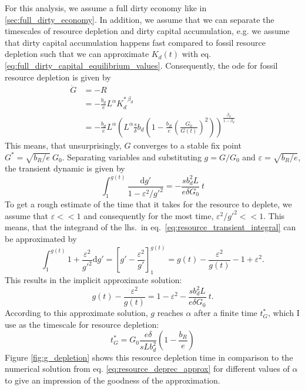For this analysis, we assume a full dirty economy like in \ref{sec:full_dirty_economy}. In addition, we assume that we can separate the timescales of resource depletion and dirty capital accumulation, e.g. we assume that dirty capital accumulation happens fast compared to fossil resource depletion such that we can approximate $K_d(t)$ with eq. \ref{eq:full_dirty_capital_equilibrium_values}. Consequently, the ode for fossil resource depletion is given by
\begin{align}
	\dot{G} &= -R \nonumber \\
        &= -\frac{b_d}{e}L^{\alpha}K_d^{*\ \beta_d} \nonumber \\
	&= - \frac{b_d}{e}L^{\alpha}\left(L^{\alpha} \frac{s}{\delta}b_d\left( 1-\frac{b_R}{e}\left( \frac{G_0}{G(t)} \right)^2 \right) \right)^{\frac{\beta_d}{1-\beta_d}}
	\label{eq:resource_deprec_approx}
\end{align}
This means, that unsurprisingly, $G$ converges to a stable fix point $G^* = \sqrt{b_R/e}\ G_0$. Separating variables and substituting $g = G/G_0$ and $\varepsilon = \sqrt{b_R/e}$, the transient dynamic is given by
\begin{equation}
	\int_1^{g(t)} \frac{{\mathrm d} g'}{1 - \varepsilon^2/g'^2} = - \frac{s b_d^2 L}{e \delta G_0} \ t
	\label{eq:resource_transient_integral}
\end{equation}
To get a rough estimate of the time that it takes for the resource to deplete, we assume that $\varepsilon << 1$ and consequently for the most time, $\varepsilon^2/g'^2 << 1$.
This means, that the integrand of the lhs.\ in eq.~\eqref{eq:resource_transient_integral} can be approximated by
\begin{equation}
	\int_1^{g(t)}1+\frac{\varepsilon^2}{g'^2} {\mathrm d}g' = \left[ g' - \frac{\varepsilon^2}{g'} \right]_1^{g(t)} = g(t) - \frac{\varepsilon^2}{g(t)} -1+\varepsilon^2.
	\label{eq:resource_transient_solution}
\end{equation}
This results in the implicit approximate solution:
\begin{equation}
  g(t) - \frac{\varepsilon^2}{g(t)} = 1 -\varepsilon^2 - \frac{s b_d^2 L}{e \delta G_0} \ t.
	\label{eq:resource_transient_solution2}
\end{equation}
According to this approximate solution, $g$ reaches $\alpha$ after a finite time $t^*_G$, which I use as the timescale for resource depletion:
\begin{equation}
	t^*_G = G_0\frac{e \delta}{s L b_d^2}\left( 1-\frac{b_R}{e} \right)
	\label{eq:resource_depletion_time}
\end{equation}
Figure \ref{fig:g_depletion} shows this resource depletion time in comparison to the numerical solution from eq. \ref{eq:resource_deprec_approx} for different values of $\alpha$ to give an impression of the goodness of the approximation.

